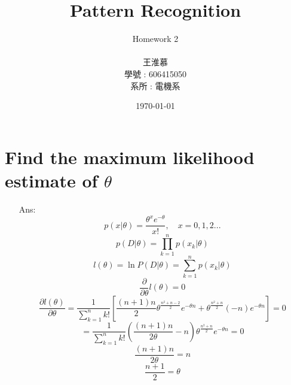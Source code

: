 \documentclass[14pt]{report}
\title{\Huge Pattern Recognition}
\author{\huge Homework 2  \\ \\王淮慕\\學號 : 606415050\\系所 : 電機系}
\date{\today}
\begin{document}
	
	\maketitle
	
	\section{Find the maximum likelihood estimate of $ \theta $}
	\begin{enumerate}
		\item[Ans:] 
		\[p(x|\theta)=\frac{\theta^xe^{-\theta}}{x!},\quad x=0,1,2... \]
		\[p(D|\theta)=\prod_{k=1}^n p(x_k|\theta) \]
		\[l(\theta)=\ln P(D|\theta)=\sum_{k=1}^{n}p(x_k|\theta) \]
		\[\frac{\partial}{\partial \theta}l(\theta)=0\]
		\[\frac{\partial l(\theta)}{\partial \theta}=\frac{1}{\sum\limits_{k=1}^{n}k!}[\frac{(n+1)n}{2}\theta^{\frac{n^2+n-2}{2}}e^{-\theta n}+\theta^{\frac{n^2+n}{2}}(-n)e^{-\theta n}]=0 \]
		\[=\frac{1}{\sum\limits_{k=1}^{n}k!}(\frac{(n+1)n}{2\theta}-n)\theta^{\frac{n^2+n}{2}}e^{-\theta n}=0 \] 
		\[\frac{(n+1)n}{2\theta}=n \]
		\[\frac{n+1}{2}=\theta \]
		
	\end{enumerate}
\end{document}
